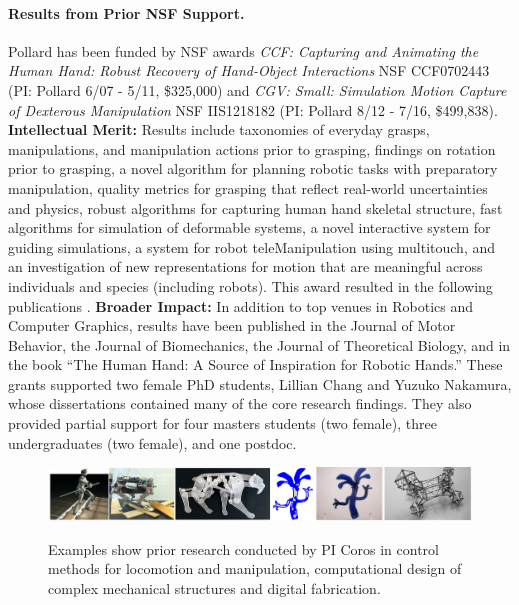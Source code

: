 \paragraph{Results from Prior NSF Support.}
Pollard has been funded by NSF awards \emph{CCF: Capturing and Animating the Human Hand: Robust Recovery of Hand-Object Interactions} NSF CCF0702443 (PI:  Pollard  6/07 - 5/11, \$325,000)  and \emph{CGV: Small: Simulation Motion Capture of Dexterous Manipulation} NSF IIS1218182 (PI:  Pollard  8/12 - 7/16, \$499,838).
{\bf Intellectual Merit:}  Results include taxonomies of everyday grasps, manipulations, and manipulation actions prior to grasping, findings on rotation prior to grasping, a novel algorithm for planning robotic tasks with preparatory manipulation, quality metrics for grasping that reflect real-world uncertainties and physics, robust
algorithms for capturing human hand skeletal structure, fast algorithms for simulation of deformable systems, a novel interactive system for guiding
simulations, a system for robot teleManipulation using multitouch, and an investigation of new
representations for motion that are meaningful across 
individuals and species (including robots).  This award resulted in the following
publications
\cite{liu2016annotating,chung2015quadratic,Liu2014,illing2014changing,kim2013physically,Toh:2012,Chang:2014,Gatesy:2011,Kappler:2012,Kim:ToG11,Kim:CGA11,Koonjul:ICRA11,Chang:JMB10,Chang:ICRA10,Kappler:Humanoids10,Chang:2009,Chang:twoAxis08,Chang:Humanoids08}.
{\bf Broader Impact:}  In addition to top venues in Robotics and Computer Graphics, results
have been published in the Journal of Motor Behavior, the Journal of
Biomechanics, the Journal of Theoretical Biology, and
in the book ``The Human Hand: A Source of Inspiration for
Robotic Hands.''  These grants supported two female PhD students, Lillian Chang and Yuzuko Nakamura,
whose dissertations contained many of the core research findings.  They also provided partial support for four masters students (two female), three undergraduates (two female),
and one postdoc.

\begin{figure}
\begin{center}
{\includegraphics[width=\linewidth]{./figs/corosPrior}}
\end{center}
\vspace*{-0.2in}
\caption{Examples show prior research conducted by PI Coros in control methods for locomotion and manipulation, computational design of complex mechanical structures and digital fabrication.}
\label{fig:corosPrior}
\end{figure}

